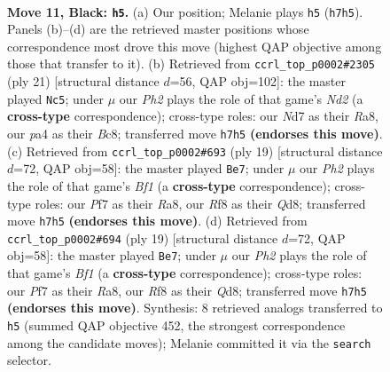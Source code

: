 \documentclass[11pt]{article}
\begin{document}
\clearpage

\begin{figure}[p]\centering
\begin{subfigure}{0.46\textwidth}\centering
\resizebox{\linewidth}{!}{%
\newchessgame
\chessboard[
  setfen={r1b1qrk1/pp1n1pbp/2pp1np1/8/PPPNP2P/2N3P1/5PB1/R1BQK2R b KQ - 0 11},
  showmover=false,
  pgfstyle=straightmove, color=movearrow, markmove={h7-h5}
]}
\caption{}
\end{subfigure}\hfill
\begin{subfigure}{0.46\textwidth}\centering
\resizebox{\linewidth}{!}{%
\newchessgame
\chessboard[
  setfen={r1bqr1k1/pp1n1pbp/2pp1np1/8/2PNP3/2N3PP/PP3PB1/R1BQR1K1 b - - 0 11},
  showmover=false,
  pgfstyle=straightmove, color=movearrow, markmove={d7-c5}
]}
\caption{}
\end{subfigure}
\\[4pt]
\begin{subfigure}{0.46\textwidth}\centering
\resizebox{\linewidth}{!}{%
\newchessgame
\chessboard[
  setfen={r2qkb1r/pb1n1ppp/1p2pn2/2p5/3PPB2/P1NB1N2/1P3PPP/R2QK2R b KQkq - 1 10},
  showmover=false,
  pgfstyle=straightmove, color=movearrow, markmove={f8-e7}
]}
\caption{}
\end{subfigure}\hfill
\begin{subfigure}{0.46\textwidth}\centering
\resizebox{\linewidth}{!}{%
\newchessgame
\chessboard[
  setfen={r2qkb1r/pb1n1ppp/1p2pn2/2p5/3PPB2/P1NB1N2/1P3PPP/R2QK2R b KQkq - 1 10},
  showmover=false,
  pgfstyle=straightmove, color=movearrow, markmove={f8-e7}
]}
\caption{}
\end{subfigure}
\caption{\textbf{Move 11, Black: \texttt{h5}.} (a) Our position; Melanie plays \texttt{h5} (\texttt{h7h5}). Panels (b)--(d) are the retrieved master positions whose correspondence most drove this move (highest QAP objective among those that transfer to it). (b) Retrieved from \texttt{ccrl\_top\_p0002\#2305} (ply 21) [structural distance $d$=56, QAP obj=102]: the master played \texttt{Nc5}; under $\mu$ our \emph{Ph2} plays the role of that game's \emph{Nd2} (a \textbf{cross-type} correspondence); cross-type roles: our \emph{N}d7 as their \emph{R}a8, our \emph{p}a4 as their \emph{B}c8; transferred move \texttt{h7h5} \textbf{(endorses this move)}. (c) Retrieved from \texttt{ccrl\_top\_p0002\#693} (ply 19) [structural distance $d$=72, QAP obj=58]: the master played \texttt{Be7}; under $\mu$ our \emph{Ph2} plays the role of that game's \emph{Bf1} (a \textbf{cross-type} correspondence); cross-type roles: our \emph{P}f7 as their \emph{R}a8, our \emph{R}f8 as their \emph{Q}d8; transferred move \texttt{h7h5} \textbf{(endorses this move)}. (d) Retrieved from \texttt{ccrl\_top\_p0002\#694} (ply 19) [structural distance $d$=72, QAP obj=58]: the master played \texttt{Be7}; under $\mu$ our \emph{Ph2} plays the role of that game's \emph{Bf1} (a \textbf{cross-type} correspondence); cross-type roles: our \emph{P}f7 as their \emph{R}a8, our \emph{R}f8 as their \emph{Q}d8; transferred move \texttt{h7h5} \textbf{(endorses this move)}. Synthesis: 8 retrieved analogs transferred to \texttt{h5} (summed QAP objective 452, the strongest correspondence among the candidate moves); Melanie committed it via the \texttt{search} selector.}

\end{figure}
\end{document}
